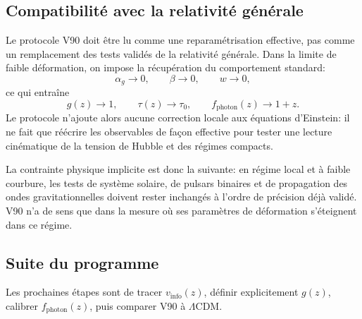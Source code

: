 \subsection{Compatibilité avec la relativité générale}
Le protocole V90 doit être lu comme une reparamétrisation effective, pas comme un remplacement des tests validés de la relativité générale. Dans la limite de faible déformation, on impose la récupération du comportement standard:
\[
\alpha_g\to 0,\qquad \beta\to 0,\qquad w\to 0,
\]
ce qui entraîne
\[
g(z)\to 1,\qquad \tau(z)\to \tau_0,\qquad f_{\mathrm{photon}}(z)\to 1+z.
\]
Le protocole n'ajoute alors aucune correction locale aux équations d'Einstein: il ne fait que réécrire les observables de façon effective pour tester une lecture cinématique de la tension de Hubble et des régimes compacts.

La contrainte physique implicite est donc la suivante: en régime local et à faible courbure, les tests de système solaire, de pulsars binaires et de propagation des ondes gravitationnelles doivent rester inchangés à l'ordre de précision déjà validé. V90 n'a de sens que dans la mesure où ses paramètres de déformation s'éteignent dans ce régime.

\subsection{Suite du programme}
Les prochaines étapes sont de tracer $v_{\mathrm{info}}(z)$, définir explicitement $g(z)$, calibrer $f_{\mathrm{photon}}(z)$, puis comparer V90 à $\Lambda$CDM.